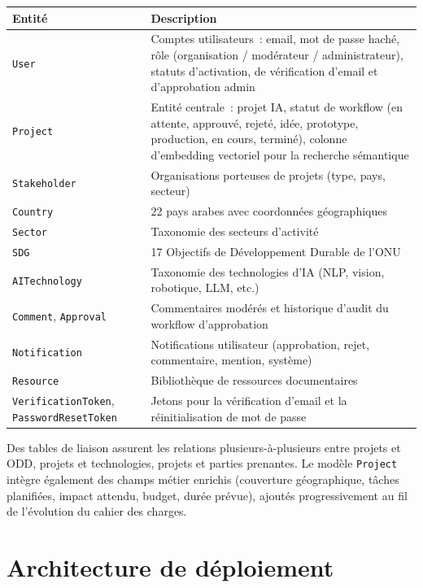\documentclass[11pt,a4paper]{report}
\begin{document}
\begin{longtable}{@{}p{3.5cm}p{10.5cm}@{}}
\toprule
\textbf{Entité} & \textbf{Description} \\
\midrule
\endhead
\texttt{User} & Comptes utilisateurs~: email, mot de passe haché, rôle (organisation / modérateur / administrateur), statuts d'activation, de vérification d'email et d'approbation admin \\
\texttt{Project} & Entité centrale~: projet IA, statut de workflow (en attente, approuvé, rejeté, idée, prototype, production, en cours, terminé), colonne d'embedding vectoriel pour la recherche sémantique \\
\texttt{Stakeholder} & Organisations porteuses de projets (type, pays, secteur) \\
\texttt{Country} & 22 pays arabes avec coordonnées géographiques \\
\texttt{Sector} & Taxonomie des secteurs d'activité \\
\texttt{SDG} & 17 Objectifs de Développement Durable de l'ONU \\
\texttt{AITechnology} & Taxonomie des technologies d'IA (NLP, vision, robotique, LLM, etc.) \\
\texttt{Comment}, \texttt{Approval} & Commentaires modérés et historique d'audit du workflow d'approbation \\
\texttt{Notification} & Notifications utilisateur (approbation, rejet, commentaire, mention, système) \\
\texttt{Resource} & Bibliothèque de ressources documentaires \\
\texttt{VerificationToken}, \texttt{PasswordResetToken} & Jetons pour la vérification d'email et la réinitialisation de mot de passe \\
\bottomrule
\end{longtable}

Des tables de liaison assurent les relations plusieurs-à-plusieurs entre projets et ODD, projets et
technologies, projets et parties prenantes. Le modèle \texttt{Project} intègre également des champs métier
enrichis (couverture géographique, tâches planifiées, impact attendu, budget, durée prévue), ajoutés
progressivement au fil de l'évolution du cahier des charges.

\section{Architecture de déploiement}
\end{document}

